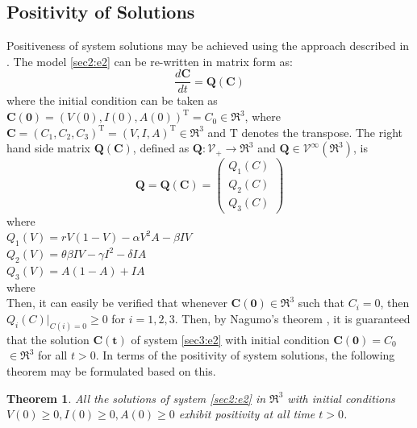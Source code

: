\documentclass[12pt]{article}
\newtheorem{theorem}{Theorem}[section]
\numberwithin{equation}{section}
\begin{document}
\subsection{Positivity of Solutions}
Positiveness of system solutions may be achieved using the approach described in \cite{gakkhar2012control}. The model \eqref{sec2:e2} can be re-written in matrix form as:
\begin{equation}\label{sec3:e1}
\frac{d\mathbf{C}}{dt}=\mathbf{Q}(\mathbf{C})
\end{equation}
where the initial condition can be taken as $\mathbf{C(0)}=(V(0), I(0), A(0))^\mathrm{T}=C_{0}\in\Re^3$, where $\mathbf{C}=(C_1, C_2, C_3)^\mathrm{T}=(V,I,A)^\mathrm{T} \in\Re^3$ and  $\mathrm{T}$ denotes the transpose. The right hand side matrix $\mathbf{Q}(\mathbf{C})$, defined as $\mathbf{Q}: \mathcal{V_+}\rightarrow \Re^3$ and $\mathbf{Q}\in\mathcal{V}^{\infty}(\Re^3)$, is
\begin{equation} \label{sec3:e2}
\mathbf{Q}=\mathbf{Q}(\mathbf{C})=
\left({\begin{matrix}
Q_1(C)\\
Q_2(C)\\
Q_3(C)
\end{matrix}}\right)
\end{equation}
where \\
$Q_1(V)=rV(1-V)-\alpha V^2A - \beta IV$\\
$Q_2(V)=\theta \beta IV - \gamma I^2 - \delta IA$\\
$Q_3(V)=A(1-A)+IA$\\
where \\
Then, it can easily be verified that whenever $\mathbf{C(0)}\in\Re^3$ such that $C_{i}=0$, then $Q_{i}(C)|_{C(i)=0}\geq 0$ for $i=1,2,3$. Then, by Nagumo's theorem \cite{nagumo1942},  it is guaranteed that the solution $\mathbf{ C(t)}$ of system \eqref{sec3:e2} with initial condition $\mathbf{C(0)}=C_0$ $\in \Re^3 $ for all $t > 0$. In terms of the positivity of system solutions, the following theorem may be formulated based on this.
\begin{theorem}\label{Theorem 3.1}
All the solutions of system \eqref{sec2:e2} in $\Re^3$ with initial conditions $V(0) \geq 0, I(0)\geq 0, A(0)\geq 0$ exhibit positivity at all time $t>0$.
\end{theorem}
\end{document}
